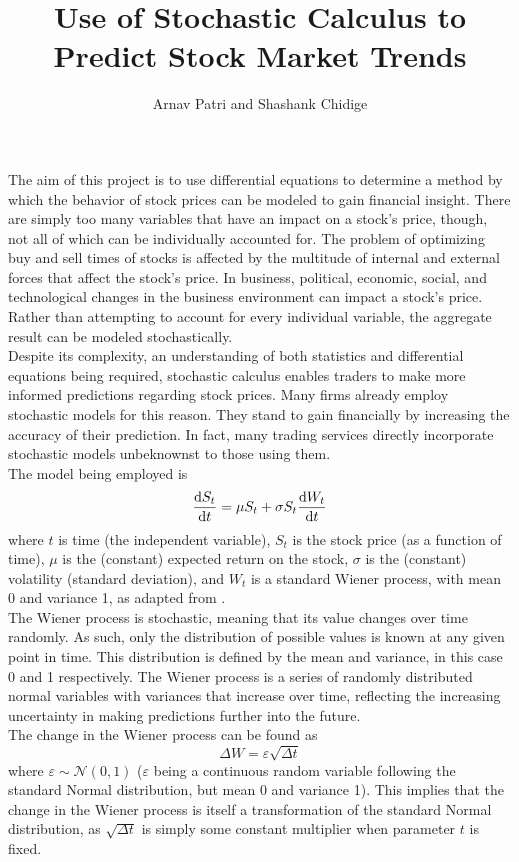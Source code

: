 \documentclass[12pt, A4]{report}
\title{Use of Stochastic Calculus to Predict Stock Market Trends}
\author{Arnav Patri and Shashank Chidige}
\date{}
\newcommand{\ndist}{\mathcal{N}}
\begin{document}
	\maketitle
	\noindent
	The aim of this project is to use differential equations to determine a method by which the behavior of stock prices can be modeled to gain financial insight. There are simply too many variables that have an impact on a stock's price, though, not all of which can be individually accounted for. The problem of optimizing buy and sell times of stocks is affected by the multitude of internal and external forces that affect the stock's price. In business, political, economic, social, and technological changes in the business environment can impact a stock's price. Rather than attempting to account for every individual variable, the aggregate result can be modeled stochastically. \\
	Despite its complexity, an understanding of both statistics and differential equations being required, stochastic calculus enables traders to make more informed predictions regarding stock prices. Many firms already employ stochastic models for this reason. They stand to gain financially by increasing the accuracy of their prediction. In fact, many trading services directly incorporate stochastic models unbeknownst to those using them. \\
	The model being employed is
		\[\dv{S_t}{t} = \mu S_t + \sigma S_t\dv{W_t}{t}\]
		where \(t\) is time (the independent variable), \(S_t\) is the stock price (as a function of time), \(\mu\) is the (constant) expected return on the stock, \(\sigma\) is the (constant) volatility (standard deviation), and \(W_t\) is a standard Wiener process, with mean 0 and variance 1, as adapted from \cite{Stochastic}. \\
		The Wiener process is stochastic, meaning that its value changes over time randomly. As such, only the distribution of possible values is known at any given point in time. This distribution is defined by the mean and variance, in this case 0 and 1 respectively. The Wiener process is a series of randomly distributed normal variables with variances that increase over time, reflecting the increasing uncertainty in making predictions further into the future. \\
		The change in the Wiener process can be found as
		\[\Delta W = \varepsilon\sqrt{\Delta t}\]
		where \(\varepsilon \sim \ndist(0, 1)\) (\(\varepsilon\) being a continuous random variable following the standard Normal distribution, but mean 0 and variance 1). This implies that the change in the Wiener process is itself a transformation of the standard Normal distribution, as \(\sqrt{\Delta t}\) is simply some constant multiplier when parameter \(t\) is fixed. \\
\end{document}
